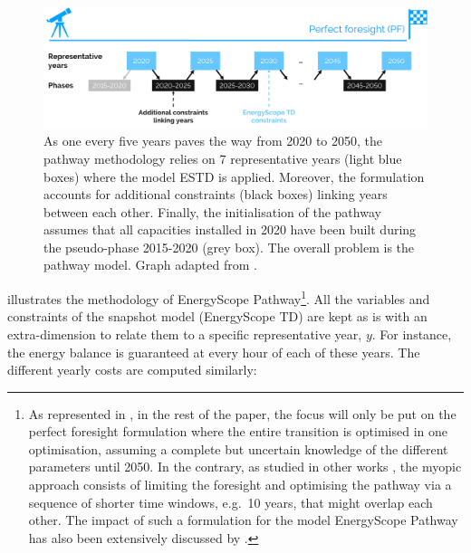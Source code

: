 \documentclass[11pt,twoside,a4paper,english]{article}
\def\eg{e.g.\ }
\begin{document}
\begin{figure}[!htbp]
\centering
\includegraphics[width=\textwidth]{figures/ES_Pathway.pdf}
\caption{As one every five years paves the way from 2020 to 2050, the pathway methodology relies on 7 representative years (light blue boxes) where the model \acrfull{ESTD} is applied. Moreover, the formulation accounts for additional constraints (black boxes) linking years between each other. Finally, the initialisation of the pathway assumes that all capacities installed in 2020 have been built during the pseudo-phase 2015-2020 (grey box). The overall problem is the pathway model. Graph adapted from \cite{limpens2023pathway}.}
\label{fig:meth_path_methodology}
\end{figure}

 illustrates the methodology of EnergyScope Pathway\footnote{As represented in , in the rest of the paper, the focus will only be put on the perfect foresight formulation where the entire transition is optimised in one optimisation, assuming a complete but uncertain knowledge of the different parameters until 2050. In the contrary, as studied in other works \cite{babrowski2014reducing,fais2016impact,heuberger2018impact}, the myopic approach consists of limiting the foresight and optimising the pathway via a sequence of shorter time windows, \eg 10 years, that might overlap each other. The impact of such a formulation for the model EnergyScope Pathway has also been extensively discussed by \citet{limpens2023pathway}.}. All the variables and constraints of the snapshot model (EnergyScope TD) are kept as is with an extra-dimension to relate them to a specific representative year, $y$. For instance, the energy balance is guaranteed at every hour of each of these years. The different yearly costs are computed similarly:
\end{document}
